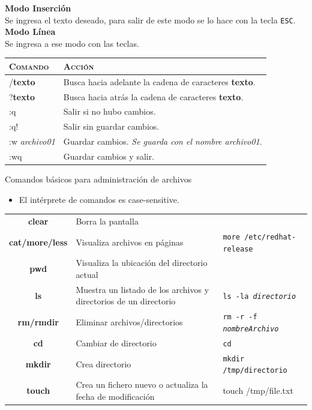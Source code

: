 \documentclass{beamer}
\begin{document}
\begin{frame}
\textbf{Modo Inserción}\\
Se ingresa el texto deseado, para salir de este modo se lo hace con la tecla \texttt{ESC}.\\[0.5cm]
\textbf{Modo Línea}\\
Se ingresa a ese modo con las teclas.
{\scriptsize
\begin{tabular}{l|l}
\textsc{Comando}&\textsc{Acción}  \\\hline
/\textbf{texto} & Busca hacia adelante la cadena de caracteres \textbf{texto}.\\\hline
?\textbf{texto} & Busca hacia atrás la cadena de caracteres \textbf{texto}.\\\hline
:q & Salir si no hubo cambios. \\\hline
:q! & Salir sin guardar cambios.\\\hline
:w \textit{archivo01} & Guardar cambios. \textit{Se guarda con el nombre archivo01}.\\\hline
:wq & Guardar cambios y salir.

\end{tabular}
}
\end{frame}
\begin{frame}{Comandos básicos para administración de archivos}
\begin{itemize}
    \item El intérprete de comandos es \textit{}{case-sensitive}.
\end{itemize}
{\scriptsize
\begin{tabular}{c|p{5cm}|l}
\hline
\textbf{clear} & Borra la pantalla   &\\
\textbf{cat/more/less}  & Visualiza archivos en páginas  & \texttt{more /etc/redhat-release}\\
\textbf{pwd} & Visualiza la ubicación del directorio actual   &\\
\textbf{ls} & Muestra un listado de los archivos y directorios de un directorio   & \texttt{ls -la \textit{directorio} }\\
\textbf{rm/rmdir} & Eliminar archivos/directorios   & \texttt{rm -r -f  \textit{nombreArchivo}}\\
\textbf{cd} & Cambiar de directorio   & \texttt{cd} \\
\textbf{mkdir} & Crea directorio   & \texttt{mkdir /tmp/directorio} \\
\textbf{touch} & Crea un fichero nuevo o actualiza la fecha de modificación & touch /tmp/file.txt
\end{tabular}
 }   
\end{frame}
\end{document}
